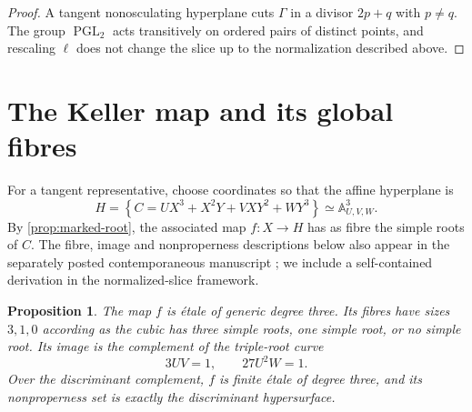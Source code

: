 \documentclass[11pt,reqno]{amsart}
\newtheorem{proposition}[proposition]{Proposition}
\theoremstyle{definition}
\theoremstyle{remark}
\newcommand{\A}{\mathbb A}
\newcommand{\set}[1]{\left\{#1\right\}}
\begin{document}
\begin{proof}
A tangent nonosculating hyperplane cuts $\Gamma$ in a divisor $2p+q$
with $p\ne q$.  The group $\operatorname{PGL}_2$ acts transitively on
ordered pairs of distinct points, and rescaling $\ell$ does not change
the slice up to the normalization described above.
\end{proof}

\section{The Keller map and its global fibres}

For a tangent representative, choose coordinates so that the affine
hyperplane is
\[
 H=\set{C=UX^3+X^2Y+VXY^2+WY^3} \simeq\A^3_{U,V,W}.
\]
By \cref{prop:marked-root}, the associated map
$f:X\to H$ has as fibre the simple roots of $C$.  The fibre, image and
nonproperness descriptions below also appear in the separately posted
contemporaneous manuscript \cite{AnonymousCounterexample}; we include a
self-contained derivation in the normalized-slice framework.

\begin{proposition}\label{prop:fibres-image}
The map $f$ is étale of generic degree three.  Its fibres have sizes
$3,1,0$ according as the cubic has three simple roots, one simple root,
or no simple root.  Its image is the complement of the triple-root curve
\[
 \boxed{3UV=1,\qquad27U^2W=1.}
\]
Over the discriminant complement, $f$ is finite étale of degree three,
and its nonproperness set is exactly the discriminant hypersurface.
\end{proposition}
\end{document}
